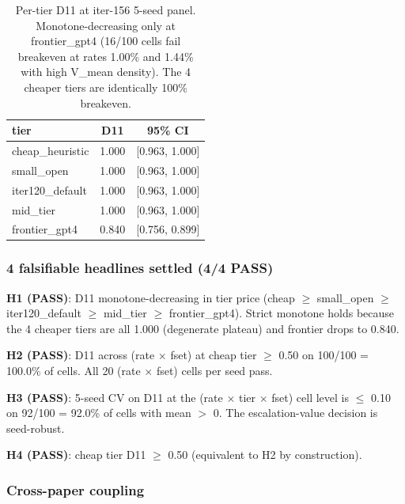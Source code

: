 \documentclass{article}
\begin{document}
\begin{table}[h]
\centering
\small
\begin{tabular}{l c c}
\hline
tier             & D11     & 95\% CI         \\
\hline
cheap\_heuristic & 1.000   & [0.963, 1.000]  \\
small\_open      & 1.000   & [0.963, 1.000]  \\
iter120\_default & 1.000   & [0.963, 1.000]  \\
mid\_tier        & 1.000   & [0.963, 1.000]  \\
frontier\_gpt4   & 0.840   & [0.756, 0.899]  \\
\hline
\end{tabular}
\caption{Per-tier D11 at iter-156 5-seed panel. Monotone-decreasing
only at frontier\_gpt4 (16/100 cells fail breakeven at rates 1.00\%
and 1.44\% with high V\_mean density). The 4 cheaper tiers are
identically 100\% breakeven.}
\label{tab:synth-iter156-d11-per-tier}
\end{table}

\subsubsection{4 falsifiable headlines settled (4/4 PASS)}

\textbf{H1 (PASS)}: D11 monotone-decreasing in tier price
(cheap $\geq$ small\_open $\geq$ iter120\_default $\geq$ mid\_tier
$\geq$ frontier\_gpt4).  Strict monotone holds because the 4 cheaper
tiers are all 1.000 (degenerate plateau) and frontier drops to 0.840.

\textbf{H2 (PASS)}: D11 across (rate $\times$ fset) at cheap tier
$\geq$ 0.50 on 100/100 = 100.0\% of cells.  All 20 (rate $\times$
fset) cells per seed pass.

\textbf{H3 (PASS)}: 5-seed CV on D11 at the (rate $\times$ tier
$\times$ fset) cell level is $\leq$ 0.10 on 92/100 = 92.0\% of cells
with mean $>$ 0.  The escalation-value decision is seed-robust.

\textbf{H4 (PASS)}: cheap tier D11 $\geq$ 0.50 (equivalent to H2 by
construction).

\subsubsection{Cross-paper coupling}
\end{document}
